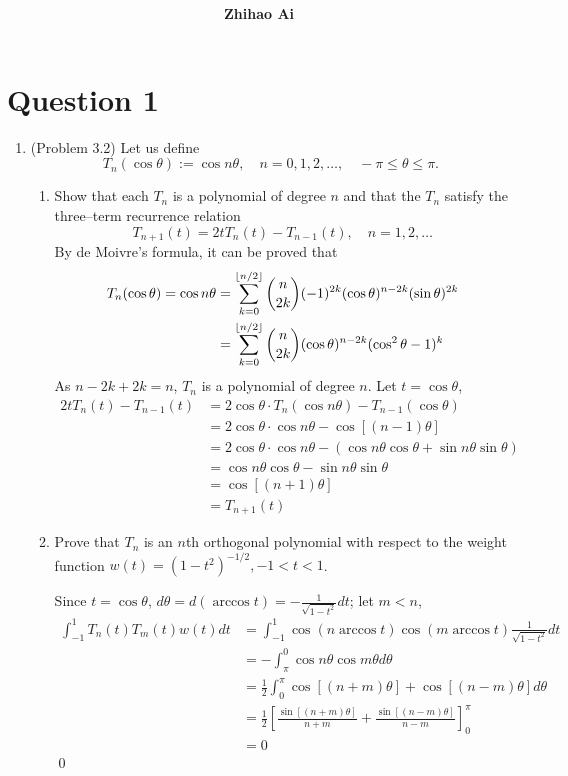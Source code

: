 \documentclass[10pt]{report}
\title{
	\vspace{2in}
	\textmd{\textbf{\hwCourse\\\hwTitle}}\\
	\vspace{0.3in}\large{\textit{\hmwkClassInstructor}}
	\vspace{3in}
}
\author{\textbf{Zhihao Ai}}
\date{}
\newcommand{\dintt}[4] {\int_{#1}^{#2} #3 d#4}
\DeclarePairedDelimiter{\floor}{\lfloor}{\rfloor}
\begin{document}
\maketitle

\section*{Question 1}
\begin{enumerate}
	\item 
	(Problem 3.2) Let us define
	\[
	T_n(\cos{\theta}) := \cos{n\theta},\quad n = 0,1,2,\dots, \quad -\pi\le \theta\le \pi.
	\]
	\begin{enumerate}
		\item 
		Show that each $T_n$ is a polynomial of degree $n$ and that the $T_n$ satisfy the three–term recurrence relation
		\[
		T_{n+1}(t) = 2tT_n(t) - T_{n-1}(t),\quad n=1,2,\dots
		\]
		By de Moivre's formula, it can be proved that
		\begin{align*}
			T_n(\cos{\theta}) = \cos{n\theta}
			&= \sum_{k=0}^{\floor{n/2}} \binom{n}{2k} (-1)^{2k} (\cos\theta)^{n-2k} (\sin\theta)^{2k}\\
			&= \sum_{k=0}^{\floor{n/2}} \binom{n}{2k} (\cos\theta)^{n-2k} (\cos^2\theta - 1)^{k}
		\end{align*}
		As $n-2k + 2k = n$, $T_n$ is a polynomial of degree $n$. Let $t=\cos\theta$,
		\begin{align*}
			2tT_n(t) - T_{n-1}(t) 
			&= 2\cos\theta \cdot T_n(\cos{n\theta}) - T_{n-1}(\cos\theta)\\
			&= 2\cos\theta \cdot \cos{n\theta} - \cos{[(n-1)\theta]}\\
			&= 2\cos\theta \cdot \cos{n\theta} - (\cos{n\theta}\cos\theta + \sin{n\theta}\sin\theta)\\
			&= \cos{n\theta}\cos\theta - \sin{n\theta}\sin\theta\\
			&= \cos{[(n+1)\theta]}\\
			&= T_{n+1}(t)
		\end{align*}
		
		\item 
		Prove that $T_n$ is an $n$th orthogonal polynomial with respect to the weight function $w(t)=(1-t^2)^{-1/2}, -1<t<1$.
		
		Since $t=\cos\theta$, $d\theta = d(\arccos{t}) = -\frac{1}{\sqrt{1-t^2}}dt$; let $m<n$,
		\begin{align*}
			\dintt{-1}{1}{T_n(t) T_m(t) w(t)}{t}
			&= \dintt{-1}{1}{\cos(n\arccos{t}) \cos(m\arccos{t}) \frac{1}{\sqrt{1-t^2}}}{t}\\
			&= -\dintt{\pi}{0}{\cos{n\theta} \cos{m\theta}}{\theta}\\
			&= \frac{1}{2}\dintt{0}{\pi}{ \cos[(n+m)\theta] + \cos[(n-m)\theta]}{\theta}\\
			&= \frac{1}{2} \left[\frac{\sin[(n+m)\theta]}{n+m} + \frac{\sin[(n-m)\theta]}{n-m} \right]_0^\pi\\
			&= 0
		\end{align*}
		\qed
		

\end{enumerate}
\end{enumerate}
\end{document}
